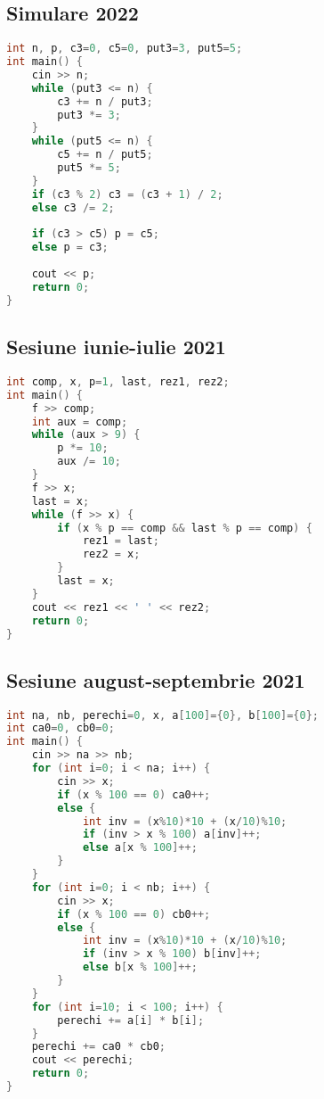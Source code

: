 \documentclass[10pt, a4paper, twocolumn]{article}
\begin{document}
\subsection*{Simulare 2022}
\begin{lstlisting}[language=C++]
int n, p, c3=0, c5=0, put3=3, put5=5;
int main() {
    cin >> n;
    while (put3 <= n) {
        c3 += n / put3;
        put3 *= 3;
    }
    while (put5 <= n) {
        c5 += n / put5;
        put5 *= 5;
    }
    if (c3 % 2) c3 = (c3 + 1) / 2;
    else c3 /= 2;
    
    if (c3 > c5) p = c5;
    else p = c3;
    
    cout << p;
    return 0;
}
\end{lstlisting}


\subsection*{Sesiune iunie-iulie 2021}
\begin{lstlisting}[language=C++]
int comp, x, p=1, last, rez1, rez2;
int main() {
    f >> comp;
    int aux = comp;
    while (aux > 9) {
        p *= 10;
        aux /= 10;
    }
    f >> x;
    last = x;
    while (f >> x) {
        if (x % p == comp && last % p == comp) {
            rez1 = last;
            rez2 = x;
        }
        last = x;
    }
    cout << rez1 << ' ' << rez2;
    return 0;
}
\end{lstlisting}
\vspace{3cm}

\subsection*{Sesiune august-septembrie 2021}
\begin{lstlisting}[language=C++]
int na, nb, perechi=0, x, a[100]={0}, b[100]={0};
int ca0=0, cb0=0;
int main() {
    cin >> na >> nb;
    for (int i=0; i < na; i++) {
        cin >> x;
        if (x % 100 == 0) ca0++;
        else {
            int inv = (x%10)*10 + (x/10)%10;
            if (inv > x % 100) a[inv]++;
            else a[x % 100]++;
        }
    }
    for (int i=0; i < nb; i++) {
        cin >> x;
        if (x % 100 == 0) cb0++;
        else {
            int inv = (x%10)*10 + (x/10)%10;
            if (inv > x % 100) b[inv]++;
            else b[x % 100]++;
        }
    }
    for (int i=10; i < 100; i++) {
        perechi += a[i] * b[i];
    }
    perechi += ca0 * cb0;
    cout << perechi;
    return 0;
}
\end{lstlisting}
\end{document}
